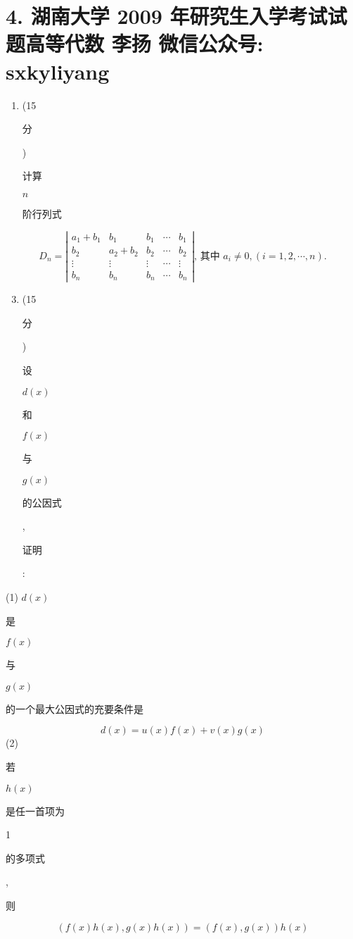 \documentclass[10pt]{article}
\begin{document}
\section{4. 湖南大学 2009 年研究生入学考试试题高等代数 
 李扬 
 微信公众号: sxkyliyang}
\begin{enumerate}
  \item (15 \begin{CJK}{UTF8}{mj}分\end{CJK}) \begin{CJK}{UTF8}{mj}计算\end{CJK} $n$ \begin{CJK}{UTF8}{mj}阶行列式\end{CJK}
\end{enumerate}
$$
D_{n}=\left|\begin{array}{ccccc}
a_{1}+b_{1} & b_{1} & b_{1} & \cdots & b_{1} \\
b_{2} & a_{2}+b_{2} & b_{2} & \cdots & b_{2} \\
\vdots & \vdots & \vdots & \cdots & \vdots \\
b_{n} & b_{n} & b_{n} & \cdots & b_{n}
\end{array}\right| \text {, 其中 } a_{i} \neq 0,(i=1,2, \cdots, n) .
$$

\begin{enumerate}
  \setcounter{enumi}{2}
  \item (15 \begin{CJK}{UTF8}{mj}分\end{CJK}) \begin{CJK}{UTF8}{mj}设\end{CJK} $d(x)$ \begin{CJK}{UTF8}{mj}和\end{CJK} $f(x)$ \begin{CJK}{UTF8}{mj}与\end{CJK} $g(x)$ \begin{CJK}{UTF8}{mj}的公因式\end{CJK}, \begin{CJK}{UTF8}{mj}证明\end{CJK}:
\end{enumerate}
(1) $d(x)$ \begin{CJK}{UTF8}{mj}是\end{CJK} $f(x)$ \begin{CJK}{UTF8}{mj}与\end{CJK} $g(x)$ \begin{CJK}{UTF8}{mj}的一个最大公因式的充要条件是\end{CJK}
$$
d(x)=u(x) f(x)+v(x) g(x)
$$
(2) \begin{CJK}{UTF8}{mj}若\end{CJK} $h(x)$ \begin{CJK}{UTF8}{mj}是任一首项为\end{CJK} 1 \begin{CJK}{UTF8}{mj}的多项式\end{CJK}, \begin{CJK}{UTF8}{mj}则\end{CJK}
$$
(f(x) h(x), g(x) h(x))=(f(x), g(x)) h(x)
$$
\end{document}
